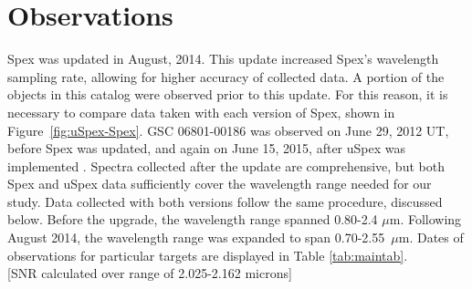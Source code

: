 \section{Observations}





Spex was updated in August, 2014.  This update increased Spex's wavelength sampling rate, allowing for higher accuracy of collected data.  
A portion of the objects in this catalog were observed prior to this update.  For this reason, it is necessary to compare data taken with each version of Spex, shown in Figure~\ref{fig:uSpex-Spex}.  
GSC 06801-00186 was observed on June 29, 2012 UT, before Spex was updated, and again on June 15, 2015, after uSpex was implemented \cite{Spextool_Manual_Cushing_2015}.  %
Spectra collected after the update are comprehensive, but both Spex and uSpex data sufficiently cover the wavelength range needed for our study.
Data collected with both versions follow the same procedure, discussed below.  Before the upgrade, the wavelength range spanned 0.80-2.4 $\mu$m.  Following August 2014, the wavelength range was expanded to span 0.70-2.55~$\mu$m.  Dates of observations for particular targets are displayed in Table \ref{tab:maintab}. \\



[SNR calculated over range of 2.025-2.162 microns]


